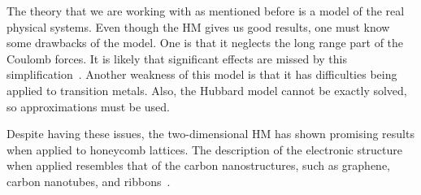 The theory that we are working with as mentioned before is a model of the real physical systems. Even though the HM gives us good results, one must know some drawbacks of the model. One is that it neglects the long range part of the Coulomb forces. It is likely that significant effects are missed by this simplification~\cite{mott}. Another weakness of this model is that it has difficulties being applied to transition metals. Also, the Hubbard model cannot be exactly solved, so approximations must be used.

Despite having these issues, the two-dimensional HM has shown promising results when applied to honeycomb lattices. The description of the electronic structure when applied resembles that of the carbon nanostructures, such as graphene, carbon nanotubes, and ribbons~\cite{graphhmc}.

